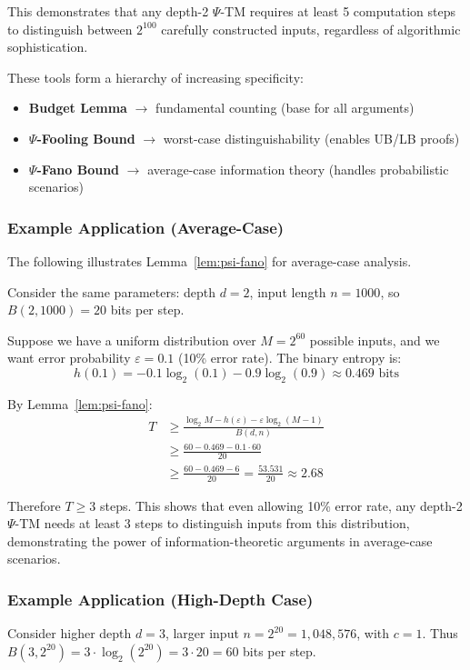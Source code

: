This demonstrates that any depth-2 $\Psi$-TM requires at least 5 computation steps to distinguish between $2^{100}$ carefully constructed inputs, regardless of algorithmic sophistication.

\begin{remark}
These tools form a hierarchy of increasing specificity:
\begin{itemize}
\item \textbf{Budget Lemma} $\to$ fundamental counting (base for all arguments)
\item \textbf{$\Psi$-Fooling Bound} $\to$ worst-case distinguishability (enables UB/LB proofs)
\item \textbf{$\Psi$-Fano Bound} $\to$ average-case information theory (handles probabilistic scenarios)
\end{itemize}
\end{remark}

\subsubsection{Example Application (Average-Case)}
The following illustrates Lemma~\ref{lem:psi-fano} for average-case analysis.

Consider the same parameters: depth $d = 2$, input length $n = 1000$, so $B(2,1000) = 20$ bits per step.

Suppose we have a uniform distribution over $M = 2^{60}$ possible inputs, and we want error probability $\varepsilon = 0.1$ (10\% error rate). The binary entropy is:
\[h(0.1) = -0.1 \log_{2}(0.1) - 0.9 \log_{2}(0.9) \approx 0.469 \text{ bits}\]

By Lemma~\ref{lem:psi-fano}:
\begin{align}
T &\geq \frac{\log_{2} M - h(\varepsilon) - \varepsilon \log_{2}(M-1)}{B(d,n)} \\
&\geq \frac{60 - 0.469 - 0.1 \cdot 60}{20} \\
&\geq \frac{60 - 0.469 - 6}{20} = \frac{53.531}{20} \approx 2.68
\end{align}

Therefore $T \geq 3$ steps. This shows that even allowing 10\% error rate, any depth-2 $\Psi$-TM needs at least 3 steps to distinguish inputs from this distribution, demonstrating the power of information-theoretic arguments in average-case scenarios.

\subsubsection{Example Application (High-Depth Case)}
Consider higher depth $d = 3$, larger input $n = 2^{20} = 1{,}048{,}576$, with $c = 1$.
Thus $B(3,2^{20}) = 3 \cdot \log_{2}(2^{20}) = 3 \cdot 20 = 60$ bits per step.

